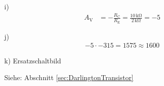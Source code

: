 {\begin{itemize}
    \item[i)]
          \begin{align*}
            A_\mathrm{V} & = -\frac{R_\mathrm{C}}{R_\mathrm{E}} = \frac{10\,\mathrm{k\Omega}}{2\,\mathrm{k\Omega}} = -5
          \end{align*}

    \item[j)]
          \begin{align*}
            -5 \cdot -315 = 1575 \approx 1600
          \end{align*}

    \item[k)] Ersatzschaltbild
          \begin{figure}[H]
            \centering
            
          \end{figure}
          Siehe: Abschnitt \ref{sec:DarlingtonTransistor}
  \end{itemize}
}
